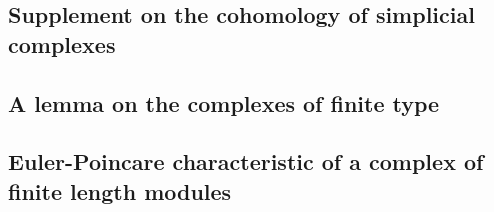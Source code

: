 \begin{remark}[11.7.3]

\end{remark}
\subsection{Supplement on the cohomology of simplicial complexes}
\label{subsection:0.11.8}

\subsection{A lemma on the complexes of finite type}
\label{subsection:0.11.9}

\subsection{Euler-Poincare characteristic of a complex of finite length modules}
\label{subsection:0.11.10}